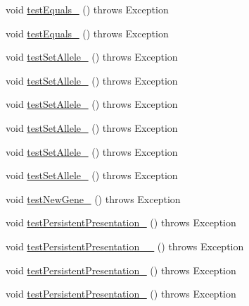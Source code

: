 \begin{DoxyCompactItemize}
\item 
void \hyperlink{classorg_1_1jgap_1_1impl_1_1_composite_gene_test_a04f83733ba86230f1480166f0896365f}{test\-Equals\-\_} ()  throws Exception 
\item 
void \hyperlink{classorg_1_1jgap_1_1impl_1_1_composite_gene_test_aee14a75e74dbf4457b861dd30dea12dd}{test\-Equals\-\_} ()  throws Exception 
\item 
void \hyperlink{classorg_1_1jgap_1_1impl_1_1_composite_gene_test_a01a7aaa5005673cdee035c2950574ed3}{test\-Set\-Allele\-\_} ()  throws Exception 
\item 
void \hyperlink{classorg_1_1jgap_1_1impl_1_1_composite_gene_test_a25e1c7f35b46c2384bf88b6773e82888}{test\-Set\-Allele\-\_} ()  throws Exception 
\item 
void \hyperlink{classorg_1_1jgap_1_1impl_1_1_composite_gene_test_af52e7d82c33a4ee2b18e5a631bd823a2}{test\-Set\-Allele\-\_} ()  throws Exception 
\item 
void \hyperlink{classorg_1_1jgap_1_1impl_1_1_composite_gene_test_a101ffc33885ef3c92b0562cbf6882b17}{test\-Set\-Allele\-\_} ()  throws Exception 
\item 
void \hyperlink{classorg_1_1jgap_1_1impl_1_1_composite_gene_test_ad4025b40eff99e3585b11a64f563677a}{test\-Set\-Allele\-\_} ()  throws Exception 
\item 
void \hyperlink{classorg_1_1jgap_1_1impl_1_1_composite_gene_test_a27a495152197e280a5eaa5fb0cfe31b3}{test\-Set\-Allele\-\_} ()  throws Exception 
\item 
void \hyperlink{classorg_1_1jgap_1_1impl_1_1_composite_gene_test_a0ad17a091c3960d0325852571f700778}{test\-New\-Gene\-\_} ()  throws Exception 
\item 
void \hyperlink{classorg_1_1jgap_1_1impl_1_1_composite_gene_test_ae695b1596207441deff4e3f918b72f2a}{test\-Persistent\-Presentation\-\_} ()  throws Exception 
\item 
void \hyperlink{classorg_1_1jgap_1_1impl_1_1_composite_gene_test_a202650fffc8afa28fbdeb43a7ab76c2c}{test\-Persistent\-Presentation\-\_\-\_} ()  throws Exception 
\item 
void \hyperlink{classorg_1_1jgap_1_1impl_1_1_composite_gene_test_a691e9d03e916efc556b423bce6956fc9}{test\-Persistent\-Presentation\-\_} ()  throws Exception 
\item 
void \hyperlink{classorg_1_1jgap_1_1impl_1_1_composite_gene_test_aa5f55acb3c2359884cff03e4cc517a59}{test\-Persistent\-Presentation\-\_} ()  throws Exception 
\item 

\end{DoxyCompactItemize}
